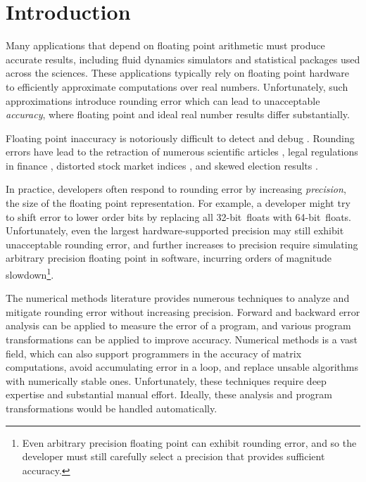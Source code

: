 \documentclass[paper.tex]{subfiles}
\begin{document}
\section{Introduction}
\label{sec:introduction}

Many applications that depend on floating point arithmetic must
produce accurate results, including fluid dynamics simulators and
statistical packages used across the sciences.  These applications
typically rely on floating point hardware to efficiently approximate
computations over real numbers.  Unfortunately, such approximations
introduce rounding error which can lead to unacceptable
\textit{accuracy}, where floating point and ideal real number results
differ substantially.


Floating point inaccuracy is notoriously difficult to detect and debug
.  Rounding errors have lead to the retraction of
numerous scientific articles , legal regulations in finance
, distorted stock market indices , and skewed
election results .

In practice, developers often respond to rounding error by increasing
\textit{precision}, the size of the floating point representation.
For example, a developer might try to shift error to lower order bits
by replacing all 32-bit~floats with 64-bit~floats.  Unfortunately,
even the largest hardware-supported precision may still exhibit
unacceptable rounding error, and further increases to precision
require simulating arbitrary precision floating point in software,
incurring orders of magnitude slowdown\footnote{Even arbitrary
  precision floating point can exhibit rounding error, and so the
  developer must still carefully select a precision that provides
  sufficient accuracy.}.

The numerical methods literature provides numerous techniques
  to analyze and mitigate rounding error without increasing precision.
Forward and backward error analysis 
  can be applied to measure the error of a program,
  and various program transformations 
  can be applied to improve accuracy.
Numerical methods is a vast field, which can also
  support programmers in the accuracy of matrix computations,
  avoid accumulating error in a loop,
  and replace unsable algorithms with numerically stable ones.
Unfortunately, these techniques require deep expertise
  and substantial manual effort.
Ideally, these analysis and program transformations
  would be handled automatically.
\end{document}
